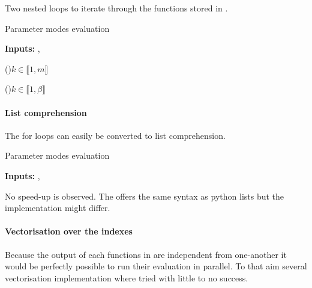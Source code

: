 Two nested loops to iterate through the functions stored in .

{}
\SetEndCharOfAlgoLine{}
\begin{algorithm}[hbtp!]
	\caption{Parameter modes evaluation}\label{alg:two}
	\textbf{Inputs: } ,  \textcolor{GreenLMS}{}
	
	\For(\textcolor{GreenLMS}{}){$k \in \llbracket 1,m \rrbracket$}{

	\For(\textcolor{GreenLMS}{}){$k \in \llbracket 1,\beta \rrbracket$}{
    }
    }
\end{algorithm}

\paragraph{List comprehension}

The for loops can easily be converted to list comprehension.

\begin{algorithm}[hbtp!]
	\caption{Parameter modes evaluation}\label{alg:two}
	\textbf{Inputs: } ,  \textcolor{GreenLMS}{}
	
\code{Para\_mode\_Lists = [[self.Para\_modes[mode][p](mu[p])} 
\code{for p in range(self.n\_para)]for mode in range(self.n\_modes)]}
\end{algorithm}

No speed-up is observed. The  offers the same syntax as python lists but the implementation might differ.

\paragraph{Vectorisation over the indexes} Because the output of each functions in  are independent from one-another it would be perfectly possible to run their evaluation in parallel. To that aim several vectorisation implementation where tried with little to no success.

